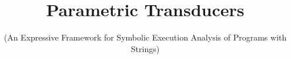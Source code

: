 \documentclass{llncs}
\newcommand{\zhilin}[1]{\color{brown} {ZL: #1 :LZ} \color{black}}
\newcommand{\zhilin}[1]{}
\begin{document}
\title{Parametric Transducers}
\subtitle{(An Expressive Framework for Symbolic 
Execution Analysis of Programs with Strings)}

\author{}
\institute{}

\maketitle


















\end{document}

